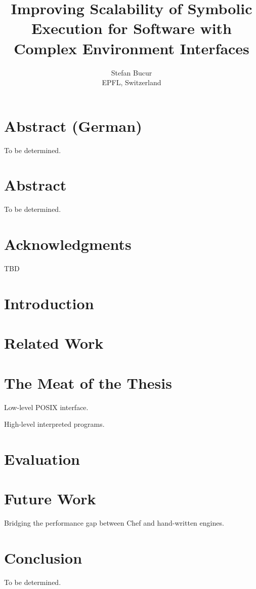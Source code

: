 \documentclass[letterpaper,12pt]{book}
\newcommand{\thesistitle}{Improving Scalability of Symbolic Execution for Software with Complex Environment Interfaces}
\begin{document}
\date{}
\title{\thesistitle}
\author{Stefan Bucur \\ EPFL, Switzerland}

\maketitle

\chapter*{Abstract (German)}

To be determined.

\chapter*{Abstract}

To be determined.

\chapter*{Acknowledgments}

TBD

\tableofcontents
\listoffigures
\listoftables

\chapter{Introduction}




\chapter{Related Work}


\chapter{The Meat of the Thesis}

Low-level POSIX interface.

High-level interpreted programs.


\chapter{Evaluation}


\chapter{Future Work}

Bridging the performance gap between Chef and hand-written engines.


\chapter{Conclusion}

To be determined.



\end{document}
